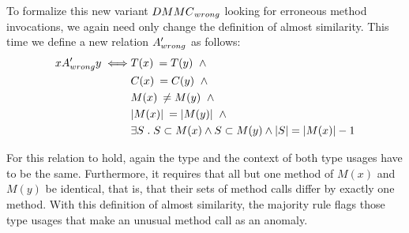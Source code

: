 To formalize this new variant $\mathnormal{DMMC}_{\mathnormal{wrong}}$ looking for erroneous method invocations, we again need only change the definition of almost similarity.
This time we define a new relation $A'_{\mathnormal{wrong}}$ as follows:
\begin{align*}
xA'_{\mathnormal{wrong}}y \iff & T(x) \: = T(y) \;\; \land \\
                                & C(x) \: = C(y) \;\; \land \\
                                & M(x) \: \neq M(y) \;\; \land \\
                                & |M(x)| \:  = |M(y)| \;\; \land \\
                                & \exists S \; . \; S \subset M(x) \land S \subset M(y) \land |S| = |M(x)| - 1
\end{align*}

For this relation to hold, again the type and the context of both type usages have to be the same.
Furthermore, it requires that all but one method of $M(x)$ and $M(y)$ be identical, that is, that their sets of method calls differ by exactly one method.
With this definition of almost similarity, the majority rule flags those type usages that make an unusual method call as an anomaly.



